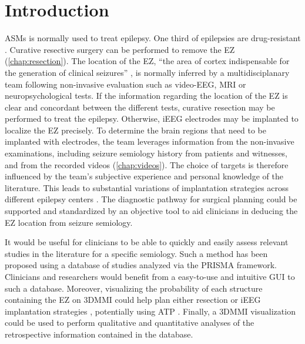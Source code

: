 \section{Introduction}

\Acp{ASM} is normally used to treat epilepsy.
One third of epilepsies are drug-resistant \cite{engel_what_2016}.
Curative resective surgery can be performed to remove the \ac{EZ} (\cref{chap:resection}).
The location of the \ac{EZ}, ``the area of cortex indispensable for the generation of clinical seizures'' \cite{rosenow_presurgical_2001}, is normally inferred by a multidisciplanary team following non-invasive evaluation such as video-\ac{EEG}, \ac{MRI} or neuropsychological tests.
If the information regarding the location of the \ac{EZ} is clear and concordant between the different tests, curative resection may be performed to treat the epilepsy.
Otherwise, \ac{iEEG} electrodes may be implanted to localize the \ac{EZ} precisely.
To determine the brain regions that need to be implanted with electrodes, the team leverages information from the non-invasive examinations, including seizure semiology history from patients and witnesses, and from the recorded videos (\cref{chap:videos}).  %
The choice of targets is therefore influenced by the team's subjective experience and personal knowledge of the literature.
This leads to substantial variations of implantation strategies across different epilepsy centers \cite{tufenkjian_seizure_2012}.
The diagnostic pathway for surgical planning could be supported and standardized by an objective tool to aid clinicians in deducing the \ac{EZ} location from seizure semiology.

It would be useful for clinicians to be able to quickly and easily assess relevant studies in the literature for a specific semiology.
Such a method has been proposed \cite{alim-marvasti_probabilistic_2021} using a database of studies analyzed via the \ac{PRISMA} framework.
Clinicians and researchers would benefit from a easy-to-use and intuitive \ac{GUI} to such a database.
Moreover, visualizing the probability of each structure containing the \ac{EZ} on \ac{3DMMI} could help plan either resection or \ac{iEEG} implantation strategies \cite{nowell_resection_2017, nowell_utility_2015}, potentially using \ac{ATP} \cite{sparks_automated_2017}.
Finally, a \ac{3DMMI} visualization could be used to perform qualitative and quantitative analyses of the retrospective information contained in the \svtdatabase database.

